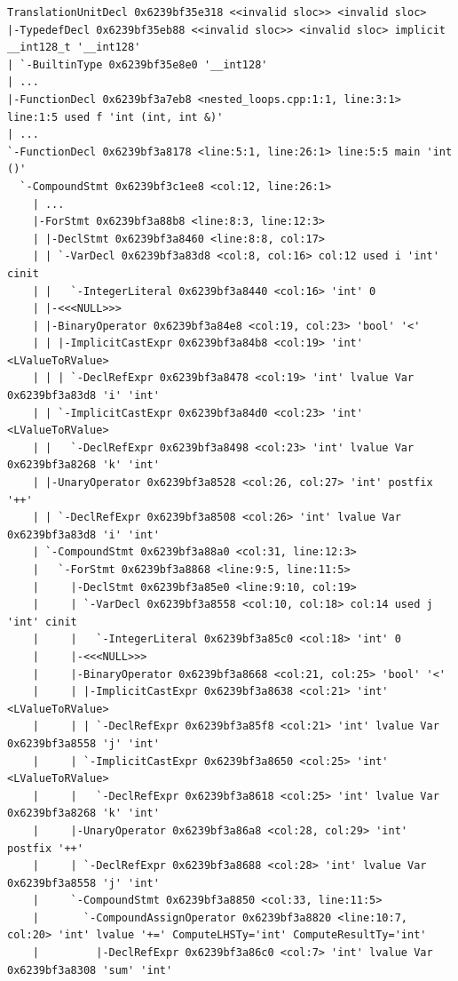 \documentclass[11pt,a4paper]{article}
\begin{document}
\begin{Verbatim}[fontsize=\scriptsize, frame=single, breaklines, breakanywhere, breakindent=4em, breaksymbolleft={}]
TranslationUnitDecl 0x6239bf35e318 <<invalid sloc>> <invalid sloc>
|-TypedefDecl 0x6239bf35eb88 <<invalid sloc>> <invalid sloc> implicit __int128_t '__int128'
| `-BuiltinType 0x6239bf35e8e0 '__int128'
| ...
|-FunctionDecl 0x6239bf3a7eb8 <nested_loops.cpp:1:1, line:3:1> line:1:5 used f 'int (int, int &)'
| ...
`-FunctionDecl 0x6239bf3a8178 <line:5:1, line:26:1> line:5:5 main 'int ()'
  `-CompoundStmt 0x6239bf3c1ee8 <col:12, line:26:1>
    | ...
    |-ForStmt 0x6239bf3a88b8 <line:8:3, line:12:3>
    | |-DeclStmt 0x6239bf3a8460 <line:8:8, col:17>
    | | `-VarDecl 0x6239bf3a83d8 <col:8, col:16> col:12 used i 'int' cinit
    | |   `-IntegerLiteral 0x6239bf3a8440 <col:16> 'int' 0
    | |-<<<NULL>>>
    | |-BinaryOperator 0x6239bf3a84e8 <col:19, col:23> 'bool' '<'
    | | |-ImplicitCastExpr 0x6239bf3a84b8 <col:19> 'int' <LValueToRValue>
    | | | `-DeclRefExpr 0x6239bf3a8478 <col:19> 'int' lvalue Var 0x6239bf3a83d8 'i' 'int'
    | | `-ImplicitCastExpr 0x6239bf3a84d0 <col:23> 'int' <LValueToRValue>
    | |   `-DeclRefExpr 0x6239bf3a8498 <col:23> 'int' lvalue Var 0x6239bf3a8268 'k' 'int'
    | |-UnaryOperator 0x6239bf3a8528 <col:26, col:27> 'int' postfix '++'
    | | `-DeclRefExpr 0x6239bf3a8508 <col:26> 'int' lvalue Var 0x6239bf3a83d8 'i' 'int'
    | `-CompoundStmt 0x6239bf3a88a0 <col:31, line:12:3>
    |   `-ForStmt 0x6239bf3a8868 <line:9:5, line:11:5>
    |     |-DeclStmt 0x6239bf3a85e0 <line:9:10, col:19>
    |     | `-VarDecl 0x6239bf3a8558 <col:10, col:18> col:14 used j 'int' cinit
    |     |   `-IntegerLiteral 0x6239bf3a85c0 <col:18> 'int' 0
    |     |-<<<NULL>>>
    |     |-BinaryOperator 0x6239bf3a8668 <col:21, col:25> 'bool' '<'
    |     | |-ImplicitCastExpr 0x6239bf3a8638 <col:21> 'int' <LValueToRValue>
    |     | | `-DeclRefExpr 0x6239bf3a85f8 <col:21> 'int' lvalue Var 0x6239bf3a8558 'j' 'int'
    |     | `-ImplicitCastExpr 0x6239bf3a8650 <col:25> 'int' <LValueToRValue>
    |     |   `-DeclRefExpr 0x6239bf3a8618 <col:25> 'int' lvalue Var 0x6239bf3a8268 'k' 'int'
    |     |-UnaryOperator 0x6239bf3a86a8 <col:28, col:29> 'int' postfix '++'
    |     | `-DeclRefExpr 0x6239bf3a8688 <col:28> 'int' lvalue Var 0x6239bf3a8558 'j' 'int'
    |     `-CompoundStmt 0x6239bf3a8850 <col:33, line:11:5>
    |       `-CompoundAssignOperator 0x6239bf3a8820 <line:10:7, col:20> 'int' lvalue '+=' ComputeLHSTy='int' ComputeResultTy='int'
    |         |-DeclRefExpr 0x6239bf3a86c0 <col:7> 'int' lvalue Var 0x6239bf3a8308 'sum' 'int'

\end{Verbatim}
\end{document}
